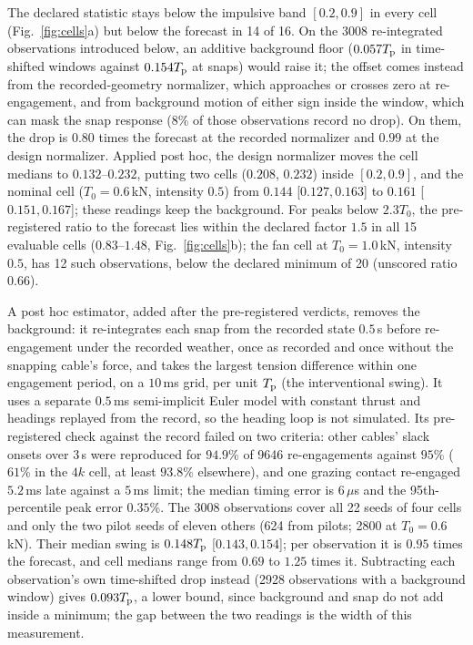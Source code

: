 The declared statistic stays below the impulsive band $[0.2,0.9]$ in every cell (Fig.~\ref{fig:cells}a) but below the forecast in 14 of 16. On the 3008 re-integrated observations introduced below, an additive background floor ($0.057T_{\mathrm{p}}$ in time-shifted windows against $0.154T_{\mathrm{p}}$ at snaps) would raise it; the offset comes instead from the recorded-geometry normalizer, which approaches or crosses zero at re-engagement, and from background motion of either sign inside the window, which can mask the snap response (8\% of those observations record no drop). On them, the drop is $0.80$ times the forecast at the recorded normalizer and $0.99$ at the design normalizer. Applied post hoc, the design normalizer moves the cell medians to $0.132$--$0.232$, putting two cells ($0.208$, $0.232$) inside $[0.2,0.9]$, and the nominal cell ($T_0=0.6$\,kN, intensity $0.5$) from $0.144$ [$0.127,0.163$] to $0.161$ [$0.151,0.167$]; these readings keep the background. For peaks below $2.3T_0$, the pre-registered ratio to the forecast lies within the declared factor $1.5$ in all 15 evaluable cells ($0.83$--$1.48$, Fig.~\ref{fig:cells}b); the fan cell at $T_0=1.0$\,kN, intensity $0.5$, has 12 such observations, below the declared minimum of 20 (unscored ratio $0.66$).

A post hoc estimator, added after the pre-registered verdicts, removes the background: it re-integrates each snap from the recorded state $0.5$\,s before re-engagement under the recorded weather, once as recorded and once without the snapping cable's force, and takes the largest tension difference within one engagement period, on a $10$\,ms grid, per unit $T_{\mathrm{p}}$ (the interventional swing). It uses a separate $0.5$\,ms semi-implicit Euler model with constant thrust and headings replayed from the record, so the heading loop is not simulated. Its pre-registered check against the record failed on two criteria: other cables' slack onsets over $3$\,s were reproduced for $94.9$\% of 9646 re-engagements against $95$\% ($61$\% in the $4k$ cell, at least $93.8$\% elsewhere), and one grazing contact re-engaged $5.2$\,ms late against a $5$\,ms limit; the median timing error is $6\,\mu$s and the 95th-percentile peak error $0.35$\%. The 3008 observations cover all 22 seeds of four cells and only the two pilot seeds of eleven others (624 from pilots; 2800 at $T_0=0.6$\,kN). Their median swing is $0.148T_{\mathrm{p}}$ [$0.143,0.154$]; per observation it is $0.95$ times the forecast, and cell medians range from $0.69$ to $1.25$ times it. Subtracting each observation's own time-shifted drop instead (2928 observations with a background window) gives $0.093T_{\mathrm{p}}$, a lower bound, since background and snap do not add inside a minimum; the gap between the two readings is the width of this measurement.

